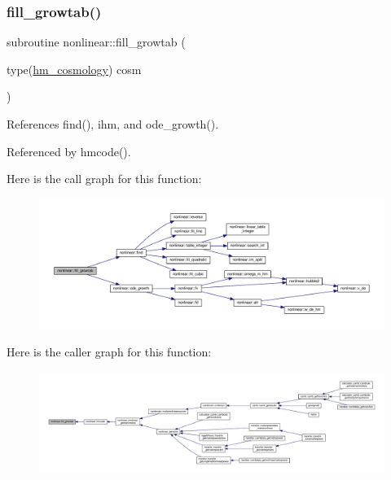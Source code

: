 \subsubsection{\texorpdfstring{fill\+\_\+growtab()}{fill\_growtab()}}
{\footnotesize\ttfamily subroutine nonlinear\+::fill\+\_\+growtab (\begin{DoxyParamCaption}\item[{type(\mbox{\hyperlink{structnonlinear_1_1hm__cosmology}{hm\+\_\+cosmology}})}]{cosm }\end{DoxyParamCaption})\hspace{0.3cm}{\ttfamily [private]}}



References find(), ihm, and ode\+\_\+growth().



Referenced by hmcode().

Here is the call graph for this function\+:
\nopagebreak
\begin{figure}[H]
\begin{center}
\leavevmode
\includegraphics[width=350pt]{namespacenonlinear_af9e22f2a04a3c5dc0f45fcd96c9b28cb_cgraph}
\end{center}
\end{figure}
Here is the caller graph for this function\+:
\nopagebreak
\begin{figure}[H]
\begin{center}
\leavevmode
\includegraphics[width=350pt]{namespacenonlinear_af9e22f2a04a3c5dc0f45fcd96c9b28cb_icgraph}
\end{center}
\end{figure}
\mbox{\label{namespacenonlinear_af44943bd607e88cf910383917ce03826}} 
